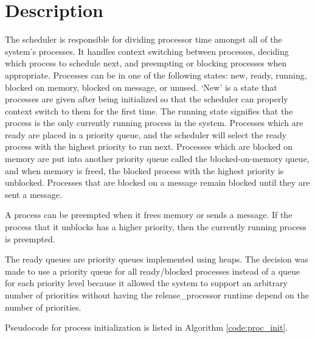 \documentclass[12pt]{report}
\begin{document}
\section{Description}
    The scheduler is responsible for dividing processor time amongst all of the
    system's processes. It handles context switching between processes, deciding
    which process to schedule next, and preempting or blocking processes when
    appropriate. Processes can be in one of the following states: new, ready,
    running, blocked on memory, blocked on message, or unused. `New' is a state
    that processes are given after being initialized so that the scheduler can
    properly context switch to them for the first time. The running state
    signifies that the process is the only currently running process in the
    system. Processes which are ready are placed in a priority queue, and the
    scheduler will select the ready process with the highest priority to run
    next. Processes which are blocked on memory are put into another priority
    queue called the blocked-on-memory queue, and when memory is freed, the
    blocked process with the highest priority is unblocked. Processes that are
    blocked on a message remain blocked until they are sent a message.

    A process can be preempted when it frees memory or sends a message. If the
    process that it unblocks has a higher priority, then the currently running
    process is preempted.

    The ready queues are priority queues implemented using heaps. The decision
    was made to use a priority queue for all ready/blocked processes instead of
    a queue for each priority level because it allowed the system to support an
    arbitrary number of priorities without having the release\_processor runtime
    depend on the number of priorities.

    Pseudocode for process initialization is listed in Algorithm
    \ref{code:proc_init}.
\end{document}
